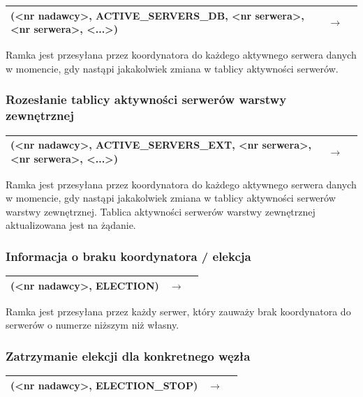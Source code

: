\begin{longtable}{| p{} | p{}| p{} |} 
\hline
(<nr nadawcy>, ACTIVE\_SERVERS\_DB, <nr serwera>, <nr serwera>, <...>)& $\rightarrow$ &  \\ \hline
\end{longtable}

Ramka jest przesyłana przez koordynatora do każdego aktywnego serwera danych w momencie, gdy nastąpi jakakolwiek zmiana w tablicy aktywności serwerów.

\subsubsection{Rozesłanie tablicy aktywności serwerów warstwy zewnętrznej}

\begin{longtable}{| p{} | p{}| p{} |} 
\hline
(<nr nadawcy>, ACTIVE\_SERVERS\_EXT, <nr serwera>, <nr serwera>, <...>)& $\rightarrow$ &  \\ \hline
\end{longtable}

Ramka jest przesyłana przez koordynatora do każdego aktywnego serwera danych w momencie, gdy nastąpi jakakolwiek zmiana w tablicy aktywności serwerów warstwy zewnętrznej. Tablica aktywności serwerów warstwy zewnętrznej aktualizowana jest na żądanie.

\subsubsection{Informacja o braku koordynatora / elekcja}

\begin{longtable}{| p{} | p{}| p{} |} 
\hline
(<nr nadawcy>, ELECTION) & $\rightarrow$ &  \\ \hline
\end{longtable}

Ramka jest przesyłana przez każdy serwer, który zauważy brak koordynatora do serwerów o numerze niższym niż własny.

\subsubsection{Zatrzymanie elekcji dla konkretnego węzła}

\begin{longtable}{| p{} | p{}| p{} |} 
\hline
(<nr nadawcy>, ELECTION\_STOP) & $\rightarrow$ &  \\ \hline
\end{longtable}

